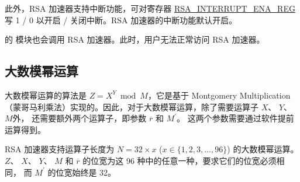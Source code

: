 \documentclass[main\_\_CN.tex]{subfiles}
\begin{document}
此外，RSA 加速器支持中断功能，可对寄存器 \hyperref[regdesc:RSAINTERRUPTENAREG]{RSA\_INTERRUPT\_ENA\_REG} 写 1 / 0 以开启 / 关闭中断。RSA 加速器的中断功能默认开启。

\begin{importantlisting}
\vspace{-0.5em}

    \chipname{} 的  模块也会调用 RSA 加速器。此时，用户无法正常访问 RSA 加速器。
\end{importantlisting}
\subsection{大数模幂运算} \label{sec:rsa-large-modular-Exponentiation}

大数模幂运算的算法是 \begin{math}Z = X^{Y} \bmod M\end{math}，它是基于 Montgomery Multiplication （蒙哥马利乘法）实现的。因此，对于大数模幂运算，除了需要运算子
\begin{math}X\end{math}、
\begin{math}Y\end{math}、
\begin{math}M\end{math}外，
还需要额外两个运算子，即参数
\begin{math}\overline{r}\end{math} 和 
\begin{math}M^{\prime}\end{math}。
这两个参数需要通过软件提前运算得到。

RSA 加速器支持运算子长度为 
\begin{math}N = 32 \times x\end{math} (\begin{math}x \in \{ 1,2,3, \dots, 96\} \end{math}) 的大数模幂运算。
\begin{math}Z\end{math}、
\begin{math}X\end{math}、
\begin{math}Y\end{math}、
\begin{math}M\end{math} 和 
\begin{math}\overline{r}\end{math}
的位宽为这 96 种中的任意一种，要求它们的位宽必须相同，
而 \begin{math}M^{\prime}\end{math} 的位宽始终是 32。
\end{document}
